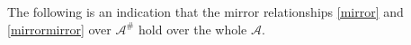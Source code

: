 \documentclass[12pt]{article}
\numberwithin{equation}{section}
\theoremstyle{remark}
\theoremstyle{definition}
\numberwithin{theorem}{section}
\def\calE{{\mathcal E}}
\def\nm{{\mathit Norm}}
\DeclareMathOperator{\rank}{rank}
\def\bE{{\mathbb{E}}}
\def\E{\mathbb{E}}
\def\L{\mathbb{L}}
\def\C{\mathbb{C}}
\def\M{{\mathcal{M}}}
\def\calA{{\mathcal{A}}}
\newcommand{\T}{{\mathbb{T}}}
\def\calO{{\mathcal O}}
\renewcommand{\1}{\mathbbm{1}}
\begin{document}





  The following is an indication  that the mirror relationships \eqref{mirror} and \eqref{mirrormirror}  over $\calA^\#$ hold over the whole $\calA$. 
\end{document}
